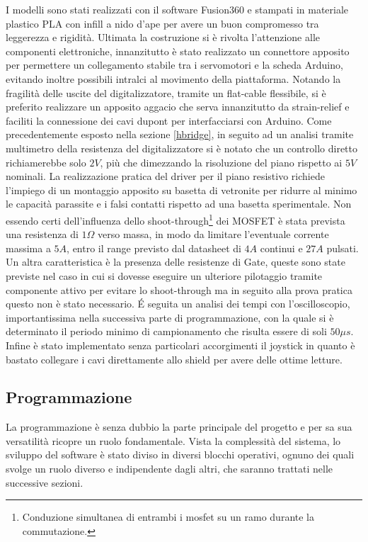 \documentclass[12pt,twoside,openright]{article}
\begin{document}
I modelli sono stati realizzati con il software Fusion360 e stampati in materiale plastico PLA con infill a nido d'ape per avere un buon compromesso tra leggerezza e rigidità. Ultimata la costruzione si è rivolta l'attenzione alle componenti elettroniche, innanzitutto è stato realizzato un connettore apposito per permettere un collegamento stabile tra i servomotori e la scheda Arduino, evitando inoltre possibili intralci al movimento della piattaforma. Notando la fragilità delle uscite del digitalizzatore, tramite un flat-cable flessibile, si è preferito realizzare un apposito aggacio che serva innanzitutto da strain-relief e faciliti la connessione dei cavi dupont per interfacciarsi con Arduino. Come precedentemente esposto nella sezione \ref{hbridge}, in seguito ad un analisi tramite multimetro della resistenza del digitalizzatore si è notato che un controllo diretto richiamerebbe solo $2V$, più che dimezzando la risoluzione del piano rispetto ai $5V$ nominali. La realizzazione pratica del driver per il piano resistivo richiede l'impiego di un montaggio apposito su basetta di vetronite per ridurre al minimo le capacità parassite e i falsi contatti rispetto ad una basetta sperimentale. Non essendo certi dell'influenza dello shoot-through\footnote{Conduzione simultanea di entrambi i mosfet su un ramo durante la commutazione.} dei MOSFET è stata prevista una resistenza di $1\Omega$ verso massa, in modo da limitare l'eventuale corrente massima a $5A$, entro il range previsto dal datasheet di $4A$ continui e $27A$ pulsati. Un altra caratteristica è la presenza delle resistenze di Gate, queste sono state previste nel caso in cui si dovesse eseguire un ulteriore pilotaggio tramite componente attivo per evitare lo shoot-through ma in seguito alla prova pratica questo non è stato necessario. É seguita un analisi dei tempi con l'oscilloscopio, importantissima nella successiva parte di programmazione, con la quale si è determinato il periodo minimo di campionamento che risulta essere di soli $50\mu s$. Infine è stato implementato senza particolari accorgimenti il joystick in quanto è bastato collegare i cavi direttamente allo shield per avere delle ottime letture.

\subsection{Programmazione}\label{programmazione}
La programmazione è senza dubbio la parte principale del progetto e per sa sua versatilità ricopre un ruolo fondamentale. Vista la complessità del sistema, lo sviluppo del software è stato diviso in diversi blocchi operativi, ognuno dei quali svolge un ruolo diverso e indipendente dagli altri, che saranno trattati nelle successive sezioni.
\end{document}
